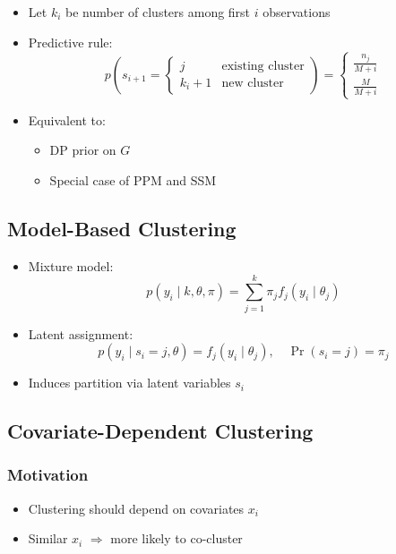 \documentclass[12pt,oneside]{book}
\numberwithin{equation}{section}
\theoremstyle{definition}
\theoremstyle{plain}
\theoremstyle{remark}
\begin{document}
\begin{itemize}
\item Let $k_i$ be number of clusters among first $i$ observations

\item Predictive rule:
\[
p(s_{i+1} =
\begin{cases}
j & \text{existing cluster} \\
k_i + 1 & \text{new cluster}
\end{cases})
=
\begin{cases}
\frac{n_j}{M + i} \\
\frac{M}{M + i}
\end{cases}
\]

\item Equivalent to:
\begin{itemize}
\item DP prior on $G$
\item Special case of PPM and SSM
\end{itemize}
\end{itemize}

\subsection*{Model-Based Clustering}

\begin{itemize}
\item Mixture model:
\[
p(y_i \mid k,\theta,\pi) = \sum_{j=1}^k \pi_j f_j(y_i \mid \theta_j)
\]

\item Latent assignment:
\[
p(y_i \mid s_i = j, \theta) = f_j(y_i \mid \theta_j), \quad \Pr(s_i=j)=\pi_j
\]

\item Induces partition via latent variables $s_i$
\end{itemize}

\subsection{Covariate-Dependent Clustering}

\subsubsection*{Motivation}

\begin{itemize}
\item Clustering should depend on covariates $x_i$
\item Similar $x_i$ $\Rightarrow$ more likely to co-cluster
\end{itemize}
\end{document}
